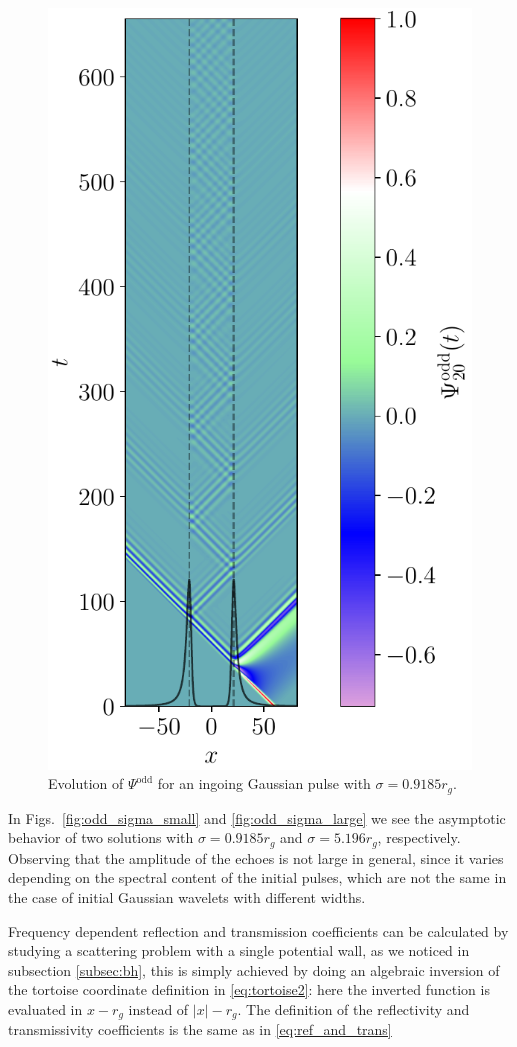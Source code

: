 \documentclass[article,aps,nofootinbib,twocolumn,superscriptaddress]{revtex4-1}
\begin{document}
\begin{figure}[t!]
\centering
\includegraphics[width=.4\textwidth]{figures/odd_wh_l_2.pdf}
\caption{\label{fig:even_evolve} Evolution of $\Psi^{\mathrm{odd}}$ for an ingoing Gaussian pulse with $\sigma=0.9185r_g$.}
\end{figure}

In Figs.~\ref{fig:odd_sigma_small} and \ref{fig:odd_sigma_large} we see the asymptotic behavior of two solutions with $\sigma=0.9185r_g$ and $\sigma=5.196r_g$, respectively. Observing that the amplitude of the echoes is not large in general, since it varies depending on the spectral content of the initial pulses, which are not the same in the case of initial Gaussian wavelets with different widths.
\par
Frequency dependent reflection and transmission coefficients can be calculated by studying a scattering problem with a single potential wall, as we noticed in subsection \ref{subsec:bh}, this is simply achieved by doing an algebraic inversion of the tortoise coordinate definition in \eqref{eq:tortoise2}: here the inverted function is evaluated in $x-r_g$ instead of $|x|-r_g$. The definition of the reflectivity and transmissivity coefficients is the same as in \eqref{eq:ref_and_trans}
\end{document}
